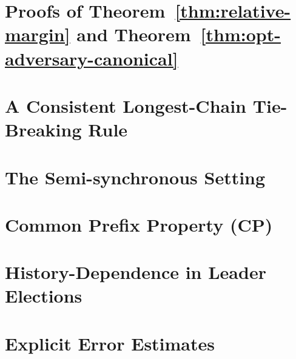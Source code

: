 \chapter{Proofs of Theorem~\ref{thm:relative-margin} and Theorem~\ref{thm:opt-adversary-canonical}}\label{sec:margin-proof-multihonest}



\chapter{A Consistent Longest-Chain Tie-Breaking Rule}\label{sec:lcr-tie-multihonest}\label{sec:lcr-model}



\chapter{The Semi-synchronous Setting}\label{sec:async-multihonest}\label{sec:async-model-multihonest}



\chapter{Common Prefix Property (CP)}\label{sec:cp-multihonest}\label{sec:cp-model-multihonest}



\chapter{History-Dependence in Leader Elections}



\chapter{Explicit Error Estimates}\label{sec:exact-prob-multihonest}


